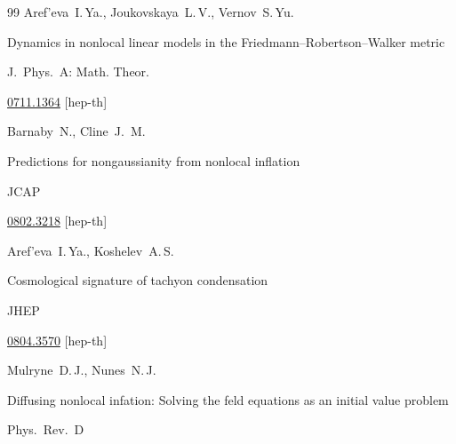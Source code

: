 \begin{thebibliography}{99}
\by Aref'eva~I.\,Ya., Joukovskaya~L.\,V., Vernov~S.\,Yu. 


\paper Dynamics in nonlocal linear models in the Friedmann--Robertson--Walker metric

\jour J.~Phys.~A: Math. Theor.




\arxiv \href{http://arxiv.org/abs/0711.1364}{0711.1364} [hep-th]





\by  Barnaby~N., Cline~J.~M.

\paper Predictions for nongaussianity from nonlocal inflation

\jour  JCAP 





\arxiv \href{http://arxiv.org/abs/0802.3218}{0802.3218} [hep-th]




\by  Aref'eva~I.\,Ya., Koshelev~A.\,S.

\paper Cosmological signature of tachyon condensation

\jour JHEP 





\arxiv \href{http://arxiv.org/abs/0804.3570}{0804.3570} [hep-th]







\by Mulryne~D.\,J., Nunes~N.\,J. 


\paper Diffusing nonlocal infation: Solving the feld equations as an initial value problem

\jour Phys.~Rev.~D




\end{thebibliography}
